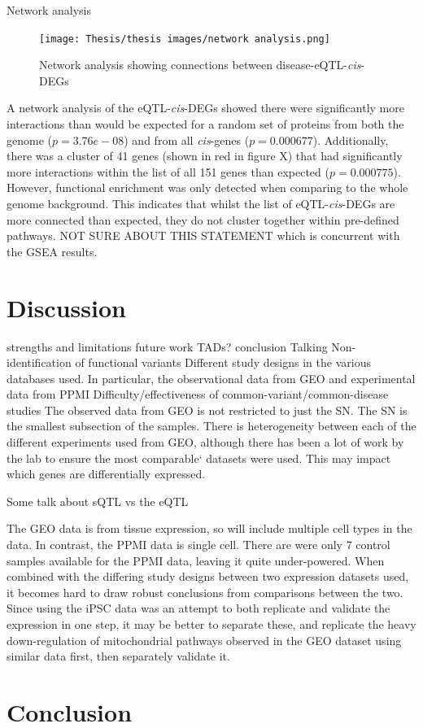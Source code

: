 \documentclass{article}
\begin{document}
Network analysis
\newpage
\begin{landscape}
\begin{figure}[h]
    \centering
    \texttt{[image: Thesis/thesis images/network analysis.png]}
    \caption{Network analysis showing connections between disease-eQTL-\textit{cis}-DEGs}
    \label{fig:enter-label}
\end{figure}
\end{landscape}
A network analysis of the eQTL-\textit{cis}-DEGs showed there were significantly more interactions than would be expected for a random set of proteins from both the genome ($p = 3.76e-08$) and from all \textit{cis}-genes ($p = 0.000677$). 
Additionally, there was a cluster of 41 genes (shown in red in figure X) that had significantly more interactions within the list of all 151 genes than expected ($p = 0.000775$). However, functional enrichment was only detected when comparing to the whole genome background. This indicates that whilst the list of eQTL-\textit{cis}-DEGs are more connected than expected, they do not cluster together within pre-defined pathways. NOT SURE ABOUT THIS STATEMENT which is concurrent with the GSEA results.



\section{Discussion}

strengths and limitations
future work
TADs?
conclusion
Talking
Non-identification of functional variants
Different study designs in the various databases used. In particular, the observational data from GEO and experimental data from PPMI 
Difficulty/effectiveness of common-variant/common-disease studies
The observed data from GEO is not restricted to just the SN. The SN is the smallest subsection of the samples. 
There is heterogeneity between each of the different experiments used from GEO, although there has been a lot of work by the lab to ensure the most comparable` datasets were used. 
This may impact which genes are differentially expressed.

Some talk about sQTL vs the eQTL


The GEO data is from tissue expression, so will include multiple cell types in the data. In contrast, the PPMI data is single cell.
There are were only 7 control samples available for the PPMI data, leaving it quite under-powered. When combined with the differing study designs between two expression datasets used, it becomes hard to draw robust conclusions from comparisons between the two. Since using the iPSC data was an attempt to both replicate and validate the expression in one step, it may be better to separate these, and replicate the heavy down-regulation of mitochondrial pathways observed in the GEO dataset using similar data first, then separately validate it.





\label{subsubsec:causality}


\section{Conclusion}




\end{document}
